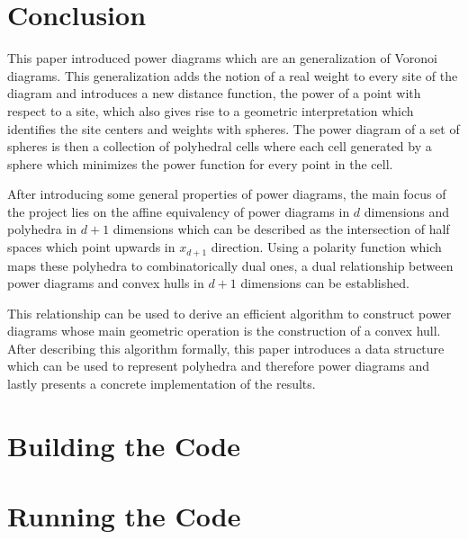 \section{Conclusion}
\label{sec:conclusion}
This paper introduced power diagrams which are an generalization of Voronoi diagrams.
This generalization adds the notion of a real weight to every site of the diagram and introduces a new distance function, the power of a point with respect to a site, which also gives rise to a geometric interpretation which identifies the site centers and weights with spheres.
The power diagram of a set of spheres is then a collection of polyhedral cells where each cell generated by a sphere which minimizes the power function for every point in the cell.

After introducing some general properties of power diagrams, the main focus of the project lies on the affine equivalency of power diagrams in $d$ dimensions and polyhedra in $d+1$ dimensions which can be described as the intersection of half spaces which point upwards in $x_{d+1}$ direction.
Using a polarity function which maps these polyhedra to combinatorically dual ones, a dual relationship between power diagrams and convex hulls in $d+1$ dimensions can be established.

This relationship can be used to derive an efficient algorithm to construct power diagrams whose main geometric operation is the construction of a convex hull.
After describing this algorithm formally, this paper introduces a data structure which can be used to represent polyhedra and therefore power diagrams and lastly presents a concrete implementation of the results.

\appendix
\section{Building the Code}
\label{sec:building_the_code}

\section{Running the Code}
\label{sec:running_the_code}

\nocite{*}



